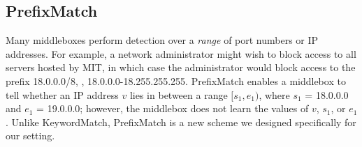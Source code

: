%
%
%
%
%
%
%
%
%
%
%
%

\subsection{PrefixMatch} \label{sec:range}

Many middleboxes perform detection over a {\it range} of port numbers or IP addresses. For example, a network administrator might wish to block access to all servers hosted by MIT, in which case the administrator would block access to the prefix 18.0.0.0/8, \ie{}, 18.0.0.0-18.255.255.255. PrefixMatch enables a middlebox to tell whether an IP address $v$ lies in between a range $[s_1, e_1)$, where $s_1$ = 18.0.0.0 and $e_1$ = 19.0.0.0; however, the middlebox does not learn the values of $v$, $s_1$, or $e_1$.
Unlike KeywordMatch, PrefixMatch is a new scheme we designed specifically for our setting.

